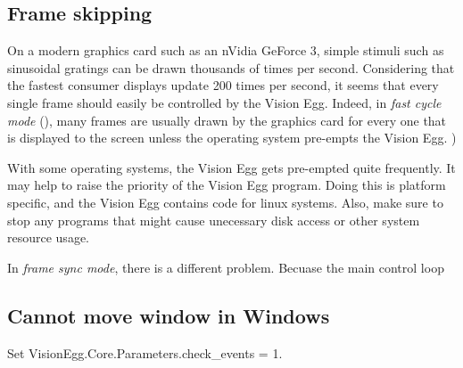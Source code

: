 \subsection{Frame skipping}

On a modern graphics card such as an nVidia GeForce 3, simple
stimuli such as sinusoidal gratings can be drawn thousands of times
per second. Considering that the fastest consumer displays update 200
times per second, it seems that every single frame should easily be
controlled by the Vision Egg. Indeed, in \emph{fast cycle mode}
(), many frames are usually drawn by the graphics card for
every one that is displayed to the screen unless the operating
system pre-empts the Vision Egg. )

With some operating systems, the Vision Egg gets pre-empted quite
frequently. It may help to raise the priority of the Vision Egg
program. Doing this is platform specific, and the Vision Egg contains
code for linux systems. Also, make sure to stop any programs that
might cause unecessary disk access or other system resource usage.

In \emph{frame sync mode}, there is a different problem.  Becuase the
main control loop

\subsection{Cannot move window in Windows}

Set VisionEgg.Core.Parameters.check_events = 1.